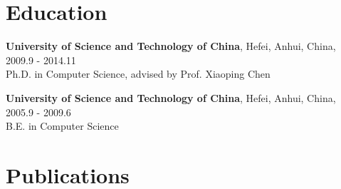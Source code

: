 \documentclass[letterpaper,10pt]{article}
\renewenvironment{itemize}{
  \begin{list}{}{
    \setlength{\leftmargin}{1.5em}
  }
}{
  \end{list}
}
\begin{document}
\vspace{10pt}
\section*{Education}
\begin{itemize}
	\item \textbf{University of Science and Technology of China}, Hefei, Anhui, China, 2009.9 - 2014.11 \\
	      Ph.D. in Computer Science, advised by Prof. Xiaoping Chen
	\item \textbf{University of Science and Technology of China}, Hefei, Anhui, China, 2005.9 - 2009.6 \\
	      B.E. in Computer Science
\end{itemize}


\vspace{10pt}
\section*{Publications}
\nocite{*}



\vspace{10pt}
\end{document}
